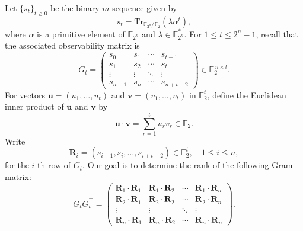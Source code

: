 \documentclass[hidelinks,onefignum,onetabnum]{siamart251216}
\theoremstyle{definition}
\theoremstyle{remark}
\providecommand{\Tr}{{\mathrm{Tr}}}
\begin{document}
Let $\{s_t\}_{t\ge 0}$ be the binary $m$-sequence given by
\[
s_t=\Tr_{\mathbb F_{2^n}/\mathbb F_2}(\lambda\alpha^t),
\]
where $\alpha$ is a primitive element of $\mathbb F_{2^n}$ and $\lambda\in \mathbb F_{2^n}^*$. For
$1\le t\le 2^n-1$, recall that the associated observability matrix is
\begin{equation}
G_t=
\begin{pmatrix}
	s_0 & s_1 & \cdots & s_{t-1}\\
	s_1 & s_2 & \cdots & s_t\\
	\vdots & \vdots & \ddots & \vdots\\
	s_{n-1} & s_n & \cdots & s_{n+t-2}
\end{pmatrix}\in \mathbb F_2^{\,n\times t}.
\end{equation}
For vectors $\mathbf{u}=(u_1,\dots,u_t)$ and $\mathbf{v}=(v_1,\dots,v_t)$ in $\mathbb F_2^t$, define the Euclidean inner product of $\mathbf{u}$ and $\mathbf{v}$ by
\[
\mathbf{u}\cdot \mathbf{v}=\sum_{r=1}^t u_rv_r \in \mathbb F_2.
\]
Write
\[
\mathbf{R}_i=(s_{i-1},s_i,\dots,s_{i+t-2})\in \mathbb F_2^t,\quad 1\le i\le n,
\]
for the $i$-th row of $G_t$. Our goal is to determine the rank of the following Gram matrix:
\[
G_tG_t^\top=
\begin{pmatrix}
	\mathbf{R}_1\cdot \mathbf{R}_1 & \mathbf{R}_1\cdot \mathbf{R}_2 & \cdots & \mathbf{R}_1\cdot \mathbf{R}_n\\
	\mathbf{R}_2\cdot \mathbf{R}_1 & \mathbf{R}_2\cdot \mathbf{R}_2 & \cdots & \mathbf{R}_2\cdot \mathbf{R}_n\\
	\vdots & \vdots & \ddots & \vdots\\
	\mathbf{R}_n\cdot \mathbf{R}_1 & \mathbf{R}_n\cdot \mathbf{R}_2 & \cdots & \mathbf{R}_n\cdot \mathbf{R}_n
\end{pmatrix}.
\]
\end{document}
